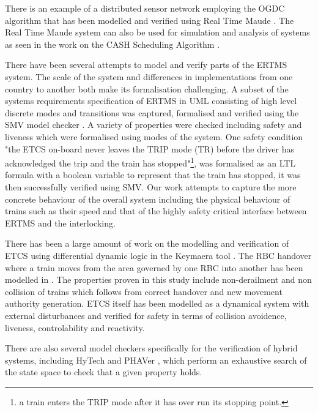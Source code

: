 There is an example of a distributed sensor network employing the OGDC algorithm that has been modelled and verified using Real Time Maude \cite{PO07}.  The Real Time Maude system can also be used for simulation and analysis of systems as seen in the work on the CASH Scheduling Algorithm \cite{PO06}.

There have been several attempts to model and verify parts of the ERTMS system. The scale of the system and differences in implementations from one country to another both make its formalisation challenging. A subset of the systems requirements specification of ERTMS in UML consisting of high level discrete modes and transitions was captured, formalised and verified using the SMV model checker \cite{MG14}. A variety of properties were checked including safety and liveness which were formalised using modes of the system. One safety condition  "the ETCS on-board never leaves the TRIP mode (TR) before the driver has acknowledged the trip and the train has stopped"\footnote{a train enters the TRIP mode after it has over run its stopping point.}, was formalised as an LTL formula with a boolean variable to represent that the train has stopped, it was then successfully verified using SMV. Our work attempts to capture the more concrete behaviour of the overall system including the physical behaviour of trains such as their speed and that of the highly safety critical interface between ERTMS and the interlocking. 

There has been a large amount of work on the modelling and verification of ETCS using differential dynamic logic \cite{AP08} in the Keymaera tool \cite{AP08b}. The RBC handover where a train moves from the area governed by one RBC into another has been modelled in \cite{YL11}. The properties proven in this study include non-derailment and non collision of trains which follows from correct handover and new movement authority generation. ETCS \cite{AP09} itself has been modelled as a dynamical system with external disturbances and verified for safety in terms of collision avoidence, liveness, controlability and reactivity.

There are also several model checkers specifically for the verification of hybrid systems, including HyTech \cite{AR96} and PHAVer \cite{GF05}, which perform an exhaustive search of the state space to check that a given property holds.

